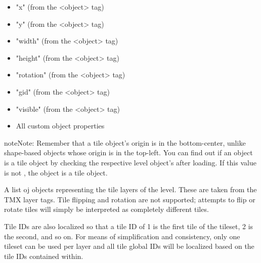 \documentclass[letterpaper,10pt,english]{sphinxmanual}
\begin{document}
\begin{fulllineitems}
\begin{fulllineitems}
\begin{itemize}
\item {} 
"x" (from the \textless{}object\textgreater{} tag)

\item {} 
"y" (from the \textless{}object\textgreater{} tag)

\item {} 
"width" (from the \textless{}object\textgreater{} tag)

\item {} 
"height" (from the \textless{}object\textgreater{} tag)

\item {} 
"rotation" (from the \textless{}object\textgreater{} tag)

\item {} 
"gid" (from the \textless{}object\textgreater{} tag)

\item {} 
"visible" (from the \textless{}object\textgreater{} tag)

\item {} 
All custom object properties

\end{itemize}

\begin{sphinxadmonition}{note}{Note:}
Remember that a tile object's origin is in the bottom-center,
unlike shape-based objects whose origin is in the top-left.
You can find out if an object is a tile object by checking the
respective level object's  after loading.  If
this value is not , the object is a tile object.
\end{sphinxadmonition}

\end{fulllineitems}


\begin{fulllineitems}
\label{\detokenize{index:ulvl.TMX.layers}}
A list oj {\hyperref[\detokenize{index:ulvl.TileLayer}]{}} objects representing the tile layers
of the level.  These are taken from the TMX layer tags.  Tile
flipping and rotation are not supported; attempts to flip or
rotate tiles will simply be interpreted as completely different
tiles.

Tile IDs are also localized so that a tile ID of 1 is the
first tile of the tileset, 2 is the second, and so on.
For means of simplification and consistency, only one tileset can
be used per layer and all tile global IDs will be localized based
on the tile IDs contained within.


\end{fulllineitems}
\end{fulllineitems}
\end{document}
